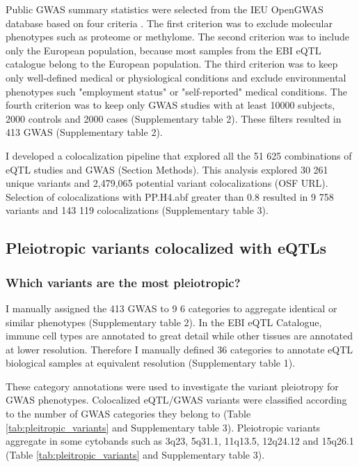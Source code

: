 Public GWAS summary statistics were selected from the IEU OpenGWAS database based on four criteria \citep{2018.Parkinson.Buniello}.
%
The first criterion was to exclude molecular phenotypes such as proteome or methylome.
%	
The second criterion was to include only the European population, because most samples from the EBI eQTL catalogue belong to the European population.
%
The third criterion was to keep only well-defined medical or physiological conditions and exclude environmental phenotypes such "employment status" or "self-reported" medical conditions.
%
The fourth criterion was to keep only GWAS studies with at least 10000 subjects, 2000 controls and 2000 cases (Supplementary table 2).
%
These filters resulted in 413 GWAS (Supplementary table 2).

I developed a colocalization pipeline that explored all the 51 625 combinations of eQTL studies and GWAS (Section Methods).
%
This analysis explored 30 261 unique variants and 2,479,065 potential variant colocalizations (OSF URL).
%
Selection of colocalizations with PP.H4.abf greater than 0.8 resulted in 9 758 variants and 143 119 colocalizations (Supplementary table 3).

\subsection*{Pleiotropic variants colocalized with eQTLs}

\subsubsection*{Which variants are the most pleiotropic?}

I manually assigned the 413 GWAS to 9
6 categories to aggregate identical or similar phenotypes (Supplementary table 2).
%
In the EBI eQTL Catalogue, immune cell types are annotated to great detail while other tissues are annotated at lower resolution.
%
Therefore I manually defined 36 categories to annotate eQTL biological samples at equivalent resolution (Supplementary table 1).

These category annotations were used to investigate the variant pleiotropy for GWAS phenotypes.
%
Colocalized eQTL/GWAS variants were classified according to the number of GWAS categories they belong to (Table \ref{tab:pleitropic_variants} and Supplementary table 3).
%
Pleiotropic variants aggregate in some cytobands such as 3q23, 5q31.1, 11q13.5, 12q24.12 and 15q26.1 (Table \ref{tab:pleitropic_variants} and Supplementary table 3).

